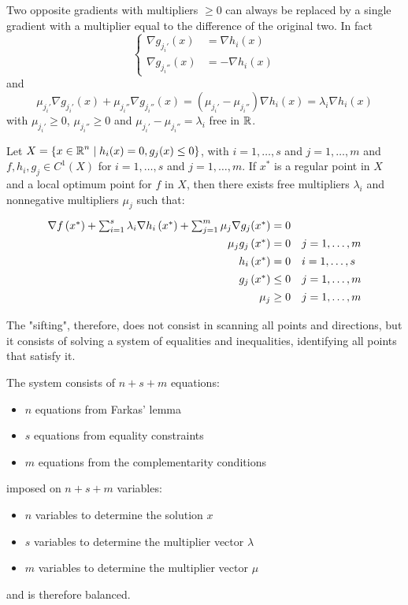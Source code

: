 Two opposite gradients with multipliers $\geq 0$ can always be replaced by a single gradient with a multiplier equal to the difference of the original two. In fact
$$ \begin{cases}
	\nabla g_{j_i'} (x) & = \nabla h_i (x) \\
	\nabla g_{j_i''} (x) & = - \nabla h_i (x)
\end{cases}$$
and 
$$ \mu_{j_i'} \nabla g_{j_i'} (x) + \mu_{j_i''} \nabla g_{j_i''} (x) = \left(\mu_{j_i'} - \mu_{j_i''}\right) \nabla h_i (x) = \lambda_i \nabla h_i (x) $$
with $\mu_{j_i'} \geq 0$, $\mu_{j_i''} \geq 0$ and $\mu_{j_i'} - \mu_{j_i''} = \lambda_i$ free in $\operatorname{\mathbb{R}}$. \\

\begin{theo}
	Let $X = \left\{x \in \operatorname{\mathbb{R}}^n \mid h_i (x) = 0, g_j (x) \leq 0\right\}$, with $i = 1, \dots, s$ and $j = 1, \dots, m$ and $f, h_i, g_j \in C^1 (X)$ for $i = 1, \dots, s$ and $j = 1, \dots, m$. If $x^\ast$ is a regular point in $X$ and a local optimum point for $f$ in $X$, then there exists free multipliers $\lambda_i$ and nonnegative multipliers $\mu_j$ such that:
	$$
	\renewcommand{\arraystretch}{1.35}
	\begin{array}{r l}
		\nabla f \left(x^\ast\right) + \sum_{i = 1}^s \lambda_i \nabla h_i \left(x^\ast \right) + \sum_{j = 1}^m \mu_j \nabla g_j (x^\ast) = 0 & \\
		\mu_j g_j \left(x^\ast \right) = 0 & j = 1, \dots, m \\
		h_i \left(x^\ast \right) = 0 & i = 1, \dots, s \\
		g_j \left(x^\ast\right) \leq 0 & j = 1, \dots, m \\
		\mu_j \geq 0 & j = 1, \dots, m
	\end{array}
	$$
\end{theo}

The "sifting", therefore, does not consist in scanning all points and directions, but it consists of solving a system of equalities and inequalities, identifying all points that satisfy it.

The system consists of $n + s + m$ equations: 
\begin{itemize}
	\item $n$ equations from Farkas' lemma
	
	\item $s$ equations from equality constraints 
	
	\item $m$ equations from the complementarity conditions
\end{itemize}
imposed on $n + s + m$ variables:
\begin{itemize}
	\item $n$ variables to determine the solution $x$ 
	
	\item $s$ variables to determine the multiplier vector $\lambda$
	
	\item $m$ variables to determine the multiplier vector $\mu$
\end{itemize}
and is therefore balanced.

